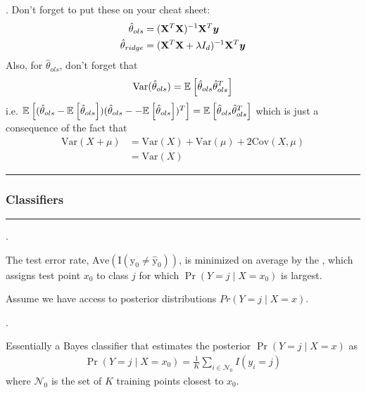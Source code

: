 \documentclass[12pt]{article}
\newcommand{\myspace}{\vspace{2\bigskipamount}}
\newcommand\p{\Needspace{10\baselineskip} \noindent}
\newcommand{\y}{\vec y}
\begin{document}
\p {}. Don't forget to put these on your cheat sheet:
\begin{align} 
\hat \theta_{ols} &= (\X^T\X)^{-1} \X^T \y\\
\hat \theta_{ridge} &= (\X^T\X + \lambda I_d)^{-1} \X^T \y 
\end{align}
Also, for $\hat\theta_{ols}$, don't forget that
\begin{align}
\mathrm{Var}(\hat{\theta}_{ols}) = \mathbb{E}_{}\left[ \hat{\theta}_{ols} \hat{\theta}_{ols}^T \right]
\end{align}
i.e. $ \mathbb{E}_{}\left[( \hat{\theta}_{ols} - \mathbb{E}_{}\left[ \hat{\theta}_{ols}\right]) (\hat{\theta}_{ols} -  - \mathbb{E}_{}\left[ \hat{\theta}_{ols}\right])^T \right] = \mathbb{E}_{}\left[ \hat{\theta}_{ols} \hat{\theta}_{ols}^T \right]$ which is just a consequence of the fact that 
\begin{align}
\mathrm{Var}(X + \mu) &= \mathrm{Var}(X) + \mathrm{Var}(\mu) + 2 \mathrm{Cov}(X, \mu) \\
&= \mathrm{Var}(X) 
\end{align}

\myspace{}
\hrule 
\subsubsection{Classifiers}
\hrule 

\myspace
\p {}. 
\begin{compactitem}[$\rightarrow$]
	\item The test error rate, $\mathrm{Ave(I(y_0 \ne \hat y_0))}$, is minimized on average by the , which assigns test point $x_0$ to class $j$ for which $\Pr(Y = j \mid X = x_0)$ is largest.
	\item Assume we have access to posterior distributions $Pr(Y = j \mid X = x)$. 
\end{compactitem}

\myspace
\p {}. 
\begin{compactitem}[$\rightarrow$]
	\item Essentially a Bayes classifier that estimates the posterior $\Pr(Y = j \mid X = x)$ as 
	\begin{align}
	\Pr(Y = j \mid X = x_0) = \frac{1}{K} \sum_{i \in \mathcal{N}_0} I(y_i = j)
	\end{align}
	where $\mathcal{N}_0$ is the set of $K$ training points closest to $x_0$. 
\end{compactitem}
\end{document}
